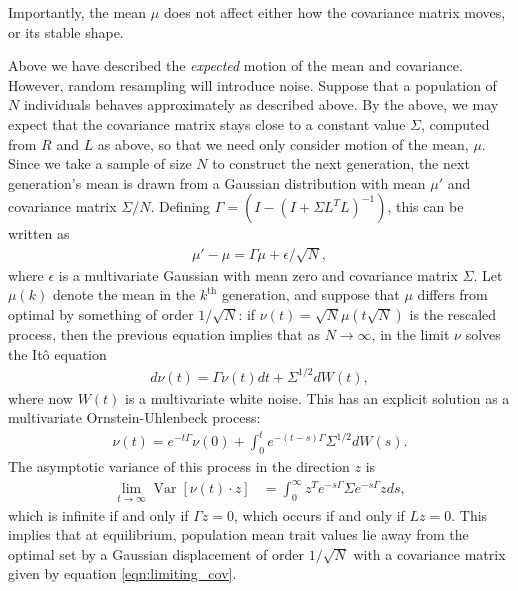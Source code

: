 \documentclass{article}
\newcommand{\var}{\mathop{\mbox{Var}}}
\newcommand{\1}{\mathbbm{1}}
\begin{document}
Importantly, the mean $\mu$ does not affect 
either how the covariance matrix moves,
or its stable shape.

Above we have described the \emph{expected} motion of the mean and covariance.
However, random resampling will introduce noise.
Suppose that a population of $N$ individuals
behaves approximately as described above.
By the above,
we may expect that the covariance matrix stays close to a constant value $\Sigma$,
computed from $R$ and $L$ as above,
so that we need only consider motion of the mean, $\mu$.
Since we take a sample of size $N$ to construct the next generation,
the next generation's mean is drawn from a Gaussian distribution with mean $\mu'$
and covariance matrix $\Sigma/N$.
Defining $\Gamma = (I - (I + \Sigma L^T L)^{-1})$,
this can be written as
\begin{align*}
    \mu' - \mu = \Gamma \mu + \epsilon/\sqrt{N} ,
\end{align*}
where $\epsilon$ is a multivariate Gaussian with mean zero and covariance matrix $\Sigma$.
Let $\mu(k)$ denote the mean in the $k^\text{th}$ generation,
and suppose that $\mu$ differs from optimal by something of order $1/\sqrt{N}$:
if $\nu(t) = \sqrt{N} \mu(t\sqrt{N})$ is the rescaled process,
then the previous equation implies that as $N \to \infty$, 
in the limit $\nu$ solves the It\^{o} equation
\begin{align*}
    d \nu(t) = \Gamma \nu(t) dt + \Sigma^{1/2} dW(t) ,
\end{align*}
where now $W(t)$ is a multivariate white noise.
This has an explicit solution as a multivariate Ornstein-Uhlenbeck process:
\begin{align*}
    \nu(t) = e^{-t \Gamma} \nu(0) + \int_0^t e^{-(t-s) \Gamma} \Sigma^{1/2} dW(s).
\end{align*}
The asymptotic variance of this process in the direction $z$ is
\begin{align} \label{eqn:limiting_cov}
    \lim_{t \to \infty} \var[\nu(t) \cdot z]
    &=
    \int_0^\infty z^T e^{-s \Gamma} \Sigma e^{-s \Gamma} z ds ,
\end{align}
which is infinite if and only if $\Gamma z = 0$,
which occurs if and only if $Lz=0$.
This implies that at equilibrium, 
population mean trait values lie away from the optimal set
by a Gaussian displacement of order $1/\sqrt{N}$
with a covariance matrix given by equation \eqref{eqn:limiting_cov}.
\end{document}
